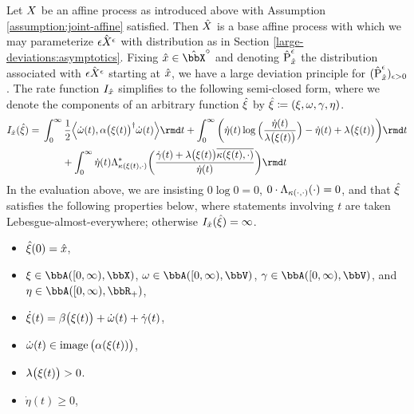 \begin{theorem}
  \label{eq:ldp-closed-form}
  Let $X$ be an affine process as introduced above with Assumption \ref{assumption:joint-affine} satisfied.
  Then $\hat{X}$ is a base affine process with which we may parameterize $\hat{\epsilon X^\epsilon}$ with distribution as in Section \ref{large-deviations:asymptotics}.
  Fixing $\hat\stateVar \in \hat\stateSpace^\circ$ and denoting $\hat{{\operatorname{P}}}^\epsilon_{\hat{x}}$ the distribution associated with $\hat{\epsilon X^\epsilon}$ starting at $\hat{x}$, we have a large deviation principle for $(\hat{{\operatorname{P}}}^\epsilon_{\hat{x}})_{\epsilon>0}$.
  The rate function $I_{\hat{x}}$ simplifies to the following semi-closed form, where we denote the components of an arbitrary function $\hat{\xi}$ by $\hat{\xi} \coloneqq (\xi, \omega, \gamma, \eta)$.
  \begin{equation*}
    \rf_{\hat\stateVar}(\hat\pathVar) = 
    \begin{aligned}[t]
      &\int_0^\infty \frac12 \Bprj{\dot\omega(t)}{\affDiff\big(\pathVar(t)\big)^\dagger \dot\omega(t)} \rmd t 
      + \int_0^\infty \bigg( \dot\eta(t)\log\Big(\frac{\dot\eta(t)}{\affInt\big(\pathVar(t)\big)} \Big) - \dot\eta(t) + \affInt\big(\pathVar(t)\big) \bigg) \rmd t  \\
      &\qquad+ \int_0^\infty \dot\eta(t) \ode_{\affDist(\pathVar(t),\cdot)}^*\bigg( \frac{\dot\gamma(t) + \affInt\big(\pathVar(t)\big)\overline{\affDist(\pathVar(t), \cdot)}}{\dot\eta(t)} \bigg) \rmd t
    \end{aligned}
  \end{equation*}
  In the evaluation above, we are insisting $0\log 0 = 0$, $0 \cdot \Lambda_{\kappa(\cdot,\cdot)}(\cdot) = 0$, and that $\hat{\xi}$ satisfies the following properties below, where statements involving $t$ are taken Lebesgue-almost-everywhere; otherwise $I_{\hat{x}}(\hat{\xi}) = \infty$.
  \begin{itemize}
    \item
      $\hat{\xi}(0) = \hat{x}$,
    \item
      $\pathVar \in \acpathSpace{[0,\infty)}{\stateSpace}$, $\omega \in \acpathSpace{[0,\infty)}{\vecSpace}$, $\gamma \in \acpathSpace{[0,\infty)}{\vecSpace}$, and $\eta \in \acpathSpace{[0,\infty)}{\bbR_+}$,
    \item
      $\dot{\xi}(t) = \beta\big(\xi(t)\big) + \dot\omega(t) + \dot\gamma(t)$,
    \item
      $\dot\omega(t) \in \operatorname{image}\big(\alpha(\xi(t))\big)$,
    \item
      $\lambda\big(\xi(t)\big) > 0$.
    \item
      $\dot\eta(t) \geq 0$,
  \end{itemize}
\end{theorem}
